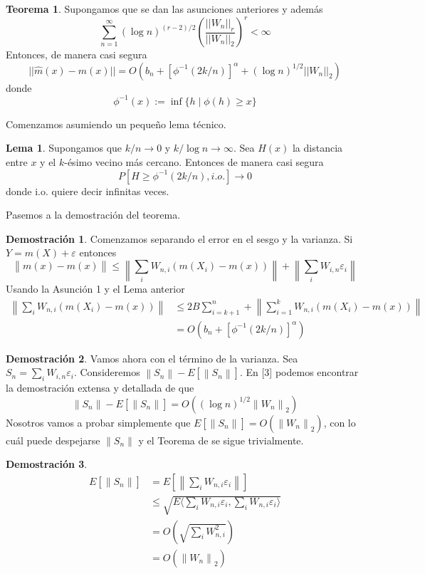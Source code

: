 \documentclass{beamer}
\theoremstyle{definition}
\newtheorem{teorema}{Teorema}
\newtheorem{lema}{Lema}
\newtheorem{dem}{Demostración}
\providecommand{\norm}[1]{\left\lVert#1\right\rVert}
\begin{document}
\begin{frame}
\begin{teorema}
Supongamos que se dan las asunciones anteriores y además
$$
\sum_{n=1}^\infty (\log n)^{(r-2)/2}\left(\frac{||W_n||_r}{||W_n||_2}\right)^r < \infty
$$
Entonces, de manera casi segura
$$
||\hat{m}(x)-m(x)|| = O(b_n + [\phi^{-1}(2k/n)]^\alpha + (\log n)^{1/2}||W_n||_2)
$$
donde
$$
\phi^{-1}(x):= \inf\{h \mid \phi(h)\geq x\}%
$$\end{teorema}
\end{frame}


\begin{frame}

Comenzamos asumiendo un pequeño lema técnico.
\begin{lema}
Supongamos que $k/n\to 0$ y $k/\log n \to \infty$. Sea $H(x)$ la distancia entre $x$ y el $k$-ésimo vecino más cercano. Entonces de manera casi segura
$$
P[H\geq \phi^{-1}(2k/n), i.o.] \to 0
$$
donde i.o. quiere decir infinitas veces.
\end{lema}

\end{frame}

\begin{frame}
Pasemos a la demostración del teorema.
\begin{dem}
Comenzamos separando el error en el sesgo y la varianza. Si $Y=m(X)+\varepsilon$ entonces
$$
\norm{m(x)-\hat{m}(x)} \leq \norm{\sum_i W_{n,i}(m(X_i)-m(x))} + \norm{\sum_i W_{i,n} \varepsilon_i}
$$
Usando la Asunción 1 y el Lema anterior
\begin{align*}
\norm{\sum_i W_{n,i}(m(X_i)-m(x))}  & \leq 2B\sum_{i=k+1}^n + \norm{\sum_{i=1}^k W_{n,i}(m(X_i)-m(x))}\\
&= O(b_n + [\phi^{-1}(2k/n)]^\alpha)
\end{align*}

\end{dem}
\end{frame}

\begin{frame}
\begin{dem}
Vamos ahora con el término de la varianza. Sea $S_n = \sum_i W_{i,n} \varepsilon_i$. Consideremos $\norm{S_n} - E[\norm{S_n}]$. En [3] podemos encontrar la demostración extensa y detallada de que $$\norm{S_n} - E[\norm{S_n}]=O((\log n)^{1/2}\norm{W_n}_2)$$
Nosotros vamos a probar simplemente que $E[\norm{S_n}]=O(\norm{W_n}_2)$, con lo cuál puede despejarse $\norm{S_n}$ y el Teorema de se sigue trivialmente.
\end{dem}
\end{frame}
\begin{frame}
\begin{dem}
\begin{align*}
E[\norm{S_n}]&=E[\norm{\sum_{i}W_{n,i}\varepsilon_i}]\\
&\leq \sqrt{E\langle \sum_{i}W_{n,i}\varepsilon_i,\sum_{i}W_{n,i}\varepsilon_i\rangle}\\
&=O\left(\sqrt{\sum_i W_{n,i}^2}\right)\\
&=O(\norm{W_n}_2)
\end{align*}

\end{dem}
\end{frame}
\end{document}
